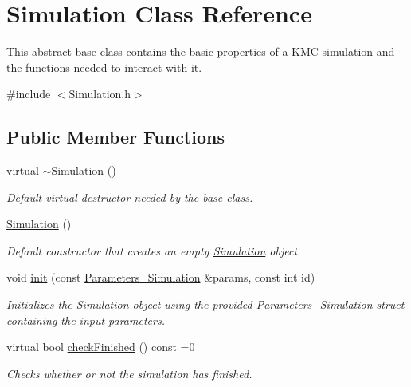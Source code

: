 \hypertarget{class_simulation}{}\section{Simulation Class Reference}
\label{class_simulation}


This abstract base class contains the basic properties of a K\+MC simulation and the functions needed to interact with it.  




{\ttfamily \#include $<$Simulation.\+h$>$}

\subsection*{Public Member Functions}
\begin{DoxyCompactItemize}
\item 
\mbox{\label{class_simulation_a80fad3f57dfaf195a36f7bc49bc88279}} 
virtual \hyperlink{class_simulation_a80fad3f57dfaf195a36f7bc49bc88279}{$\sim$\+Simulation} ()
\begin{DoxyCompactList}\small\item\em Default virtual destructor needed by the base class. \end{DoxyCompactList}\item 
\hyperlink{class_simulation_a5b224cc5b36bcc8eb29689aff223de41}{Simulation} ()
\begin{DoxyCompactList}\small\item\em Default constructor that creates an empty \hyperlink{class_simulation}{Simulation} object. \end{DoxyCompactList}\item 
void \hyperlink{class_simulation_af88e5e0634b373ba28f1dd87670725a6}{init} (const \hyperlink{struct_parameters___simulation}{Parameters\+\_\+\+Simulation} \&params, const int id)
\begin{DoxyCompactList}\small\item\em Initializes the \hyperlink{class_simulation}{Simulation} object using the provided \hyperlink{struct_parameters___simulation}{Parameters\+\_\+\+Simulation} struct containing the input parameters. \end{DoxyCompactList}\item 
virtual bool \hyperlink{class_simulation_af69bb46977a3a0084214a194c888e16c}{check\+Finished} () const =0
\begin{DoxyCompactList}\small\item\em Checks whether or not the simulation has finished. \end{DoxyCompactList}\item 

\end{DoxyCompactItemize}
